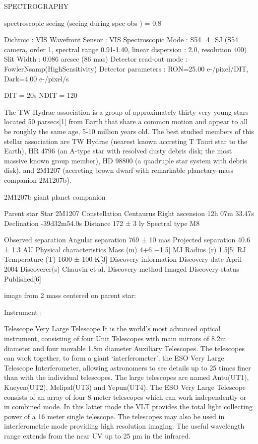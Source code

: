 \documentclass[12pt,a4paper]{article}  %
\begin{document}
SPECTROGRAPHY

spectroscopic seeing (seeing during spec obs ) = 0.8



Dichroic                      : VIS
Wavefront Sensor              : VIS
Spectroscopic Mode            : S54\_4\_SJ
(S54 camera, order 1, spectral range 0.91-1.40, linear dispersion : 2.0, resolution 400)
Slit Width                    : 0.086 arcsec (86 mas)
Detector read-out mode        : FowlerNsamp(HighSensitivity)
Detector parameters           : RON=25.00 e-/pixel/DIT, Dark=4.00 e-/pixel/s

DIT = 20s
NDIT = 120



The TW Hydrae association is a group of approximately thirty very young stars located 50 parsecs[1] from Earth that share a common motion and appear to all be roughly the same age, 5-10 million years old. The best studied members of this stellar association are TW Hydrae (nearest known accreting T Tauri star to the Earth), HR 4796 (an A-type star with resolved dusty debris disk; the most massive known group member), HD 98800 (a quadruple star system with debris disk), and 2M1207 (accreting brown dwarf with remarkable planetary-mass companion 2M1207b).

2M1207b giant planet companion

Parent star
Star	2M1207
Constellation	Centaurus
Right ascension		12h 07m 33.47s
Declination		-39d32m54.0s
Distance	172 ± 3 ly
Spectral type	M8

Observed separation
Angular separation	769 ± 10 mas
Projected separation	40.6 ± 1.3 AU
Physical characteristics
Mass	(m)	4+6
−1[5] MJ
Radius	(r)	1.5[5] RJ
Temperature	(T)	1600 ± 100 K[3]
Discovery information
Discovery date	April 2004
Discoverer(s)	Chauvin et al.
Discovery method	Imaged
Discovery status	Published[6]




image from 2 mass  centered on parent star:



Instrument : 

Telescope Very Large Telescope
 It is the world's most advanced optical instrument, consisting of four Unit Telescopes with main mirrors of 8.2m diameter and four movable 1.8m diameter Auxiliary Telescopes. The telescopes can work together, to form a giant ‘interferometer’, the ESO Very Large Telescope Interferometer, allowing astronomers to see details up to 25 times finer than with the individual telescopes. 
The large telescopes are named Antu(UT1), Kueyen(UT2), Melipal(UT3) and Yepun(UT4).
The ESO Very Large Telescope consists of an array of four 8-meter telescopes which can work independently or in combined mode. In this latter mode the VLT provides the total light collecting power of a 16 meter single telescope. The telescopes may also be used in interferometric mode providing high resolution imaging. The useful wavelength range extends from the near UV up to 25 µm in the infrared. 
\end{document}
